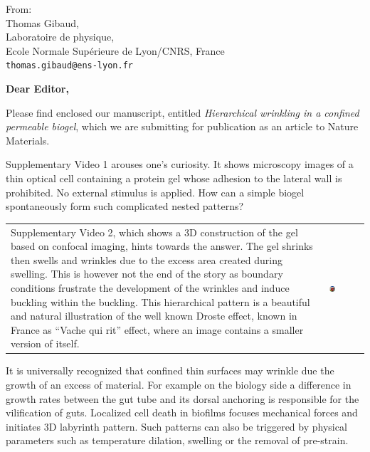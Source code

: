 \documentclass[a4paper, parskip=true, firsthead=false, fromemail=true, foldmarks=false]{scrlttr2}
\begin{document}
\begin{letter}{From:\\
Thomas Gibaud,\\
Laboratoire de physique,\\
Ecole Normale Supérieure de Lyon/CNRS, France\\
\texttt{thomas.gibaud@ens-lyon.fr}
}
\opening{\bf Dear Editor,}

Please find enclosed our manuscript, entitled \emph{Hierarchical wrinkling in a confined permeable biogel}, which we are submitting for publication as an article to Nature Materials.



Supplementary Video 1 arouses one's curiosity. It shows microscopy images of a thin optical cell containing a protein gel whose adhesion to the lateral wall is prohibited. No external stimulus is applied. How can a simple biogel spontaneously form such complicated nested patterns?


\begin{tabu}{@{}X[m]m{0.2\textwidth}}
Supplementary Video 2, which shows a 3D construction of the gel based on confocal imaging, hints towards the answer. The gel shrinks then swells and wrinkles due to the excess area created during swelling. This is however not the end of the story as boundary conditions frustrate the development of the wrinkles and induce buckling within the buckling. This hierarchical pattern is a beautiful and natural illustration of the well known Droste effect, known in France as ``Vache qui rit'' effect, where an image contains a smaller version of itself.&
\includegraphics[width=0.2\textwidth]{../vachequirit.jpg}
\end{tabu}







It is universally recognized that confined thin surfaces may wrinkle due the growth of an excess of material. For example on the biology side a difference in growth rates between the gut tube and its dorsal anchoring is responsible for the vilification of guts. Localized cell death in biofilms focuses mechanical forces and initiates 3D labyrinth pattern. Such patterns can also be triggered by physical parameters such as temperature dilation, swelling or the removal of pre-strain.


\end{letter}
\end{document}
